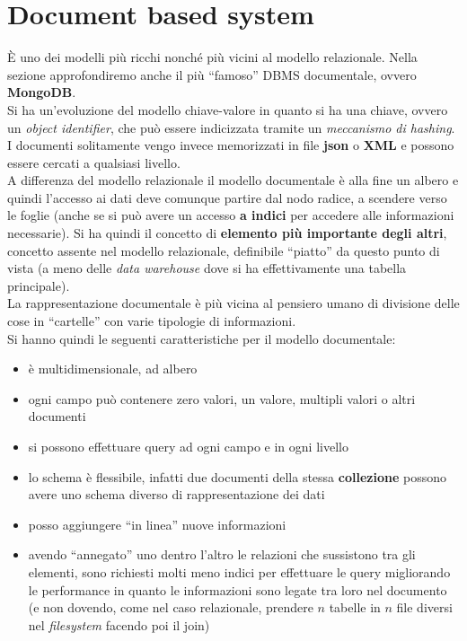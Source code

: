 \documentclass[a4paper,12pt, oneside]{book}
\begin{document}
\section{Document based system}
È uno dei modelli più ricchi nonché più vicini al modello relazionale. Nella
sezione approfondiremo anche il più ``famoso'' DBMS documentale, ovvero
\textbf{MongoDB}.\\
Si ha un'evoluzione del modello chiave-valore in quanto si ha una chiave, ovvero
un \textit{object identifier}, che può essere indicizzata tramite un
\textit{meccanismo di hashing}. I documenti solitamente vengo invece memorizzati
in file \textbf{json} o \textbf{XML} e possono essere cercati a qualsiasi
livello.\\
A differenza del modello relazionale il modello documentale è alla fine un
albero e quindi l'accesso ai dati deve comunque partire dal nodo radice, a
scendere verso le foglie (anche se si può avere un accesso \textbf{a indici} per
accedere alle informazioni necessarie). Si ha quindi il concetto di
\textbf{elemento più importante degli altri}, concetto assente nel modello
relazionale, definibile ``piatto'' da questo punto di vista (a meno delle
\textit{data warehouse} dove si ha effettivamente una tabella principale).\\
La rappresentazione documentale è più vicina al pensiero umano di divisione
delle cose in ``cartelle'' con varie tipologie di informazioni. \\
Si hanno quindi le seguenti caratteristiche per il modello documentale:
\begin{itemize}
  \item è multidimensionale, ad albero
  \item ogni campo può contenere zero valori, un valore, multipli valori o altri
  documenti
  \item si possono effettuare query ad ogni campo e in ogni livello
  \item lo schema è flessibile, infatti due documenti della stessa
  \textbf{collezione} possono avere uno schema diverso di rappresentazione dei
  dati
  \item posso aggiungere ``in linea'' nuove informazioni
  \item avendo ``annegato'' uno dentro l'altro le relazioni che sussistono tra
  gli elementi, sono richiesti molti meno indici per effettuare le query
  migliorando le performance in quanto le informazioni sono legate tra loro nel
  documento (e non dovendo, come nel caso relazionale, prendere $n$ tabelle in
  $n$ file diversi nel \textit{filesystem} facendo poi il join)
\end{itemize}
\end{document}
